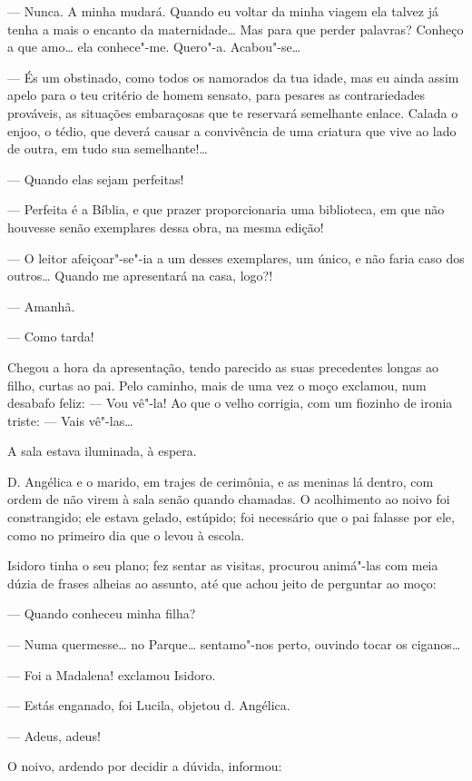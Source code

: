 --- Nunca. A minha mudará. Quando eu voltar da minha viagem ela talvez
já tenha a mais o encanto da maternidade\ldots{} Mas para que perder
palavras? Conheço a que amo\ldots{} ela conhece"-me. Quero"-a. Acabou"-se\ldots{}

--- És um obstinado, como todos os namorados da tua idade, mas eu ainda
assim apelo para o teu critério de homem sensato, para pesares as
contrariedades prováveis, as situações embaraçosas que te reservará
semelhante enlace. Calada o enjoo, o tédio, que deverá causar a
convivência de uma criatura que vive ao lado de outra, em tudo sua
semelhante!\ldots{}

--- Quando elas sejam perfeitas!

--- Perfeita é a Bíblia, e que prazer proporcionaria uma biblioteca, em
que não houvesse senão exemplares dessa obra, na mesma edição!

--- O leitor afeiçoar"-se"-ia a um desses exemplares, um único, e não
faria caso dos outros\ldots{} Quando me apresentará na casa, logo?!

--- Amanhã.

--- Como tarda!

Chegou a hora da apresentação, tendo parecido as suas precedentes longas
ao filho, curtas ao pai. Pelo caminho, mais de uma vez o moço exclamou,
num desabafo feliz: --- Vou vê"-la! Ao que o velho corrigia, com um
fiozinho de ironia triste: --- Vais vê"-las\ldots{}

A sala estava iluminada, à espera.

D. Angélica e o marido, em trajes de cerimônia, e as meninas lá dentro,
com ordem de não virem à sala senão quando chamadas. O acolhimento ao
noivo foi constrangido; ele estava gelado, estúpido; foi necessário que
o pai falasse por ele, como no primeiro dia que o levou à escola.

Isidoro tinha o seu plano; fez sentar as visitas, procurou animá"-las com
meia dúzia de frases alheias ao assunto, até que achou jeito de
perguntar ao moço:

--- Quando conheceu minha filha?

--- Numa quermesse\ldots{} no Parque\ldots{} sentamo"-nos perto, ouvindo tocar os
ciganos\ldots{}

--- Foi a Madalena! exclamou Isidoro.

--- Estás enganado, foi Lucila, objetou d. Angélica.

--- Adeus, adeus!

O noivo, ardendo por decidir a dúvida, informou:

